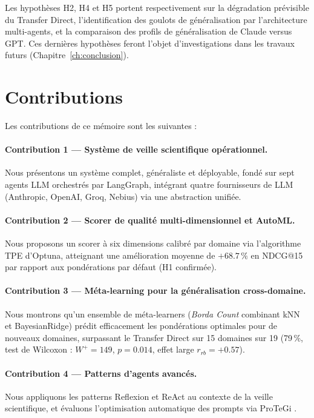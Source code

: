 Les hypothèses H2, H4 et H5 portent respectivement sur la dégradation
prévisible du Transfer Direct, l'identification des goulots de généralisation
par l'architecture multi-agents, et la comparaison des profils de généralisation
de Claude versus GPT. Ces dernières hypothèses feront l'objet d'investigations
dans les travaux futurs (Chapitre~\ref{ch:conclusion}).

\section{Contributions}

Les contributions de ce mémoire sont les suivantes :

\paragraph{Contribution 1 — Système de veille scientifique opérationnel.}
Nous présentons un système complet, généraliste et déployable, fondé sur
sept agents LLM orchestrés par LangGraph, intégrant quatre fournisseurs
de LLM (Anthropic, OpenAI, Groq, Nebius) via une abstraction unifiée.

\paragraph{Contribution 2 — Scorer de qualité multi-dimensionnel et AutoML.}
Nous proposons un scorer à six dimensions calibré par domaine via
l'algorithme TPE d'Optuna, atteignant une amélioration moyenne de
$+68.7\,\%$ en NDCG@15 par rapport aux pondérations par défaut (H1 confirmée).

\paragraph{Contribution 3 — Méta-learning pour la généralisation cross-domaine.}
Nous montrons qu'un ensemble de méta-learners (\textit{Borda Count} combinant
kNN et BayesianRidge) prédit efficacement les pondérations optimales pour
de nouveaux domaines, surpassant le Transfer Direct sur 15 domaines sur 19
(79\,\%, test de Wilcoxon : $W^+ = 149$, $p = 0.014$, effet large $r_{rb} = +0.57$).

\paragraph{Contribution 4 — Patterns d'agents avancés.}
Nous appliquons les patterns Reflexion \cite{shinn2023reflexion} et
ReAct \cite{yao2022react} au contexte de la veille scientifique, et
évaluons l'optimisation automatique des prompts via ProTeGi
\cite{pryzant2023automatic}.

